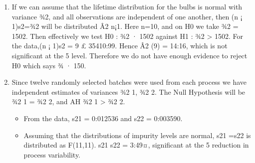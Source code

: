 \documentclass[a4paper,12pt]{article}
\begin{document}
\begin{enumerate}
\item If we can assume that the lifetime distribution for the bulbs is normal with variance ¾2,
and all observations are independent of one another, then (n ¡ 1)s2=¾2 will be distributed Â2
n¡1.
Here n=10, and on H0 we take ¾2 = 1502. Then effectively we test H0 : ¾2 · 1502 against
H1 : ¾2 > 1502.
For the data,(n ¡ 1)s2 = 9 £ 35410:99. Hence Â2
(9) = 14:16, which is not significant at the 5%
level. Therefore we do not have enough evidence to reject H0 which says ¾ · 150.

\item Since twelve randomly selected batches were used from each process we have independent estimates
of variances ¾2
1, ¾2
2. The Null Hypothesis will be ¾2
1 = ¾2
2, and AH ¾2
1 > ¾2
2.
\begin{itemize}
\item From the data, s21
= 0:012536 and s22
= 0:003590.
\item Assuming that the distributions of impurity levels are normal, s21
=s22
is distributed as F(11,11).
s21
s22
= 3:49¤, significant at the 5%
reduction in process variability.
\end{itemize}
\end{enumerate}
\end{document}
